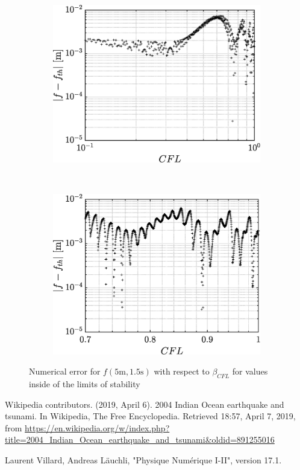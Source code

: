 \documentclass[a4paper,12pt,twoside]{article}
\begin{document}
    \begin{figure}
     \begin{subfigure}{0.5\textwidth}
     \includegraphics[width=\textwidth]{graphs/convCFL01.eps}
     \end{subfigure}
     ~
     \begin{subfigure}{0.5\textwidth}
     \includegraphics[width=\textwidth]{graphs/convCFL01zoom.eps}
     \end{subfigure}
     \caption{Numerical error for $f(5\text{m},1.5\text{s})$ with respect to $\beta_{CFL}$ for values inside of the limits of stability}
     \label{fig:stable}

    \end{figure}




  \newpage
  \begin{thebibliography}{99}
     Wikipedia contributors. (2019, April 6). 2004 Indian Ocean earthquake and tsunami. In Wikipedia, The Free Encyclopedia. Retrieved 18:57, April 7, 2019, from \url{https://en.wikipedia.org/w/index.php?title=2004_Indian_Ocean_earthquake_and_tsunami&oldid=891255016}
    
     Laurent Villard, Andreas Läuchli, "Physique Numérique I-II", version 17.1.


  \end{thebibliography}
\end{document}
